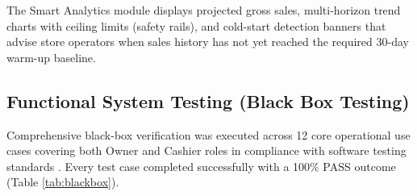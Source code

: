 \documentclass[10pt,a4paper]{article}
\begin{document}
The Smart Analytics module displays projected gross sales, multi-horizon trend charts with ceiling limits (safety rails), and cold-start detection banners that advise store operators when sales history has not yet reached the required 30-day warm-up baseline.

\subsection{Functional System Testing (Black Box Testing)}
Comprehensive black-box verification was executed across 12 core operational use cases covering both Owner and Cashier roles in compliance with software testing standards \cite{pressman2020, myers2011, iso2021}. Every test case completed successfully with a 100\% PASS outcome (Table \ref{tab:blackbox}).
\end{document}
